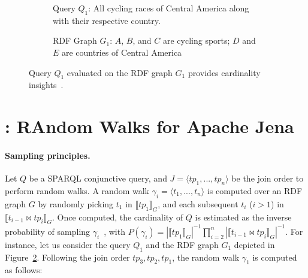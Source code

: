 
\begin{figure}
  \setlength{\fboxsep}{0pt} %
  \begin{subfigure}{0.48\textwidth}
    \caption{\label{fig:q1-j2-1hop}Query $Q_1$: All cycling races of Central America along
      with their respective country.}
  \end{subfigure}
  \hfill
  \begin{subfigure}{0.48\textwidth}
    \fbox{%
      \resizebox{\textwidth}{!}{%
        
    }}
    \caption{RDF Graph $G_1$: $A$, $B$, and $C$ are cycling sports; $D$ and $E$
      are countries of Central America~\cite{10.1007/978-3-031-33455-9_3}}
  \end{subfigure}
  \caption{\label{fig:random_walks_example}Query $Q_1$ evaluated on
    the RDF graph $G_1$ provides cardinality insights~\cite{10.1007/978-3-031-33455-9_3}.}
\end{figure}

\section{\NAME: RAndom Walks for Apache Jena}
\label{sec:proposal}

\paragraph{Sampling principles.}

Let $Q$ be a SPARQL conjunctive query, and $J = \langle tp_1, ..., tp_n \rangle$ be
the join order to perform random walks. A random walk
$\gamma_i = \langle t_1, ..., t_n\rangle$ is computed over
an RDF graph $G$ by randomly picking $t_1$ in $\llbracket tp_1 \rrbracket_G$,
and each subsequent $t_i$ ($i > 1$) in $\llbracket t_{i-1} \bowtie tp_i \rrbracket_G$.
Once computed, the cardinality of $Q$ is estimated as  the inverse probability
of sampling $\gamma_i$~\cite{li2019wanderjoin}, with $P(\gamma_i) = |\llbracket tp_1 \rrbracket_G|^{-1} \prod_{i=2}^{n}
|\llbracket t_{i-1} \bowtie tp_i \rrbracket_G|^{-1}$.
%
For instance, let us consider the query $Q_1$ and the RDF graph $G_1$
depicted in Figure~\ref{fig:random_walks_example}. Following the join order $tp_3,tp_2,tp_1$, the random walk $\gamma_1$ is computed as
follows:

